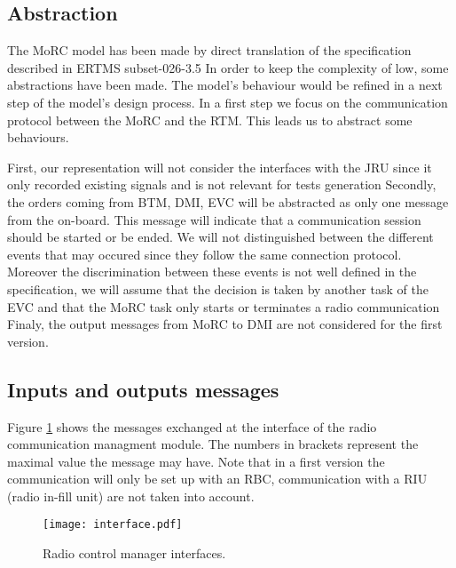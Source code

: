 \subsection{Abstraction}
\label{subsec:abstaction}
The MoRC model has been made by direct translation of the specification described
in ERTMS subset-026-3.5 In order to keep the complexity of low, some
abstractions have been made. The model's behaviour would be refined in a next step
of the model's design process. In a first step we focus on the communication
protocol between the MoRC and the RTM. This leads us to abstract some behaviours.

First, our representation will not consider the interfaces with the JRU
since it only recorded existing signals and is not relevant for tests
generation
Secondly, the orders coming from BTM, DMI, EVC will be abstracted as only one message
from the on-board. This message will indicate that a communication session
should be started or be ended. We will not distinguished between the different
events that may occured since they follow the same connection protocol. Moreover the discrimination
between these events is not well defined in the specification, we will assume
that the decision is taken by another task of the EVC and that the MoRC task only
 starts or terminates a radio communication
Finaly, the output messages from MoRC to DMI are not considered for the first version.


\subsection{Inputs and outputs messages}
\label{subsec:inputoutput}

Figure \ref{fig:interfaces} shows the messages exchanged at the interface of
the radio communication managment module. The numbers in brackets represent the maximal value the message
may have. Note that in a first version the communication will only be set up
with an RBC, communication with a RIU (radio in-fill unit) are not taken
into account.

\begin{figure}[htpb]
\centering
\texttt{[image: interface.pdf]}
\caption{\label{fig:interfaces} Radio control manager interfaces.}
\end{figure}

